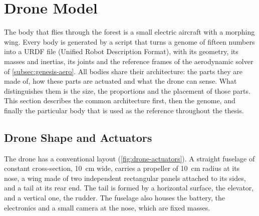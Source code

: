 \section{Drone Model}
\label{sec:drone-model}

The body that flies through the forest is a small electric aircraft with a morphing wing. Every body is generated by a script that turns a genome of fifteen numbers into a URDF file (Unified Robot Description Format), with its geometry, its masses and inertias, its joints and the reference frames of the aerodynamic solver of \autoref{subsec:genesis-aero}. All bodies share their architecture: the parts they are made of, how these parts are actuated and what the drone can sense. What distinguishes them is the size, the proportions and the placement of those parts. This section describes the common architecture first, then the genome, and finally the particular body that is used as the reference throughout the thesis.

\subsection{Drone Shape and Actuators}
\label{subsec:drone-shape}

The drone has a conventional layout (\autoref{fig:drone-actuators}). A straight fuselage of constant cross-section, 10~cm wide, carries a propeller of 10~cm radius at its nose, a wing made of two independent rectangular panels attached to its sides, and a tail at its rear end. The tail is formed by a horizontal surface, the elevator, and a vertical one, the rudder. The fuselage also houses the battery, the electronics and a small camera at the nose, which are fixed masses.

